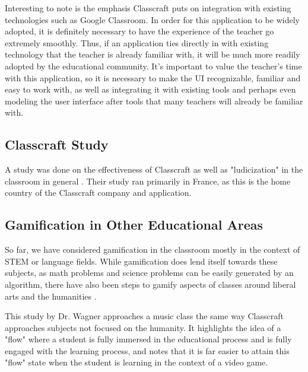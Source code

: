 Interesting to note is the emphasis Classcraft puts on integration with existing technologies such as Google Classroom. In order for this application to be widely adopted, it is definitely necessary to have the experience of the teacher go extremely smoothly. Thus, if an application ties directly in with existing technology that the teacher is already familiar with, it will be much more readily adopted by the educational community. It's important to value the teacher's time with this application, so it is necessary to make the UI recognizable, familiar and easy to work with, as well as integrating it with existing tools and perhaps even modeling the user interface after tools that many teachers will already be familiar with.

\subsection{Classcraft Study}
A study was done on the effectiveness of Classcraft as well as "ludicization" in the classroom in general \cite{sanchez2016classcraft}. Their study ran primarily in France, as this is the home country of the Classcraft company and application.

\subsection{Gamification in Other Educational Areas}
So far, we have considered gamification in the classroom mostly in the context of STEM or language fields. While gamification does lend itself towards these subjects, as math problems and science problems can be easily generated by an algorithm, there have also been steps to gamify aspects of classes around liberal arts and the humanities \cite{wagner2017digital}. 

This study by Dr. Wagner approaches a music class the same way Classcraft approaches subjects not focused on the humanity. It highlights the idea of a "flow" where a student is fully immersed in the educational process and is fully engaged with the learning process, and notes that it is far easier to attain this "flow" state when the student is learning in the context of a video game.